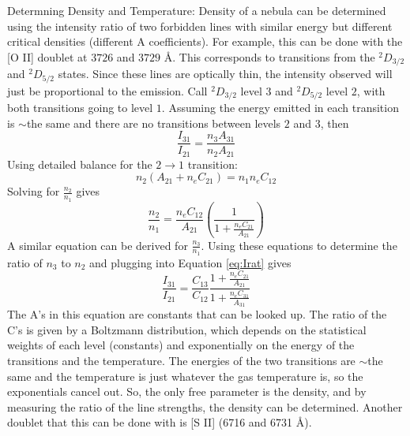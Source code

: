 Determning Density and Temperature:
Density of a nebula can be determined using the intensity ratio of two forbidden lines with 
similar energy but different critical densities (different A coefficients).  For example, 
this can be done with the [O II] doublet at $3726$ and $3729$ \AA.  This corresponds to transitions 
from the $^2D_{3/2}$ and $^2D_{5/2}$ states.  Since these lines are optically thin, the intensity 
observed will just be proportional to the emission.  Call $^2D_{3/2}$ level $3$ and $^2D_{5/2}$ 
level $2$, with both transitions going to level $1$.  Assuming the energy emitted in each 
transition is $\sim$the same and there are no transitions between levels $2$ and $3$, then
\begin{equation}\label{eq:Irat}
\frac{I_{31}}{I_{21}}=\frac{n_3A_{31}}{n_2A_{21}}
\end{equation}
Using detailed balance for the $2\rightarrow1$ transition:
\begin{equation}
n_2(A_{21}+n_eC_{21})=n_1n_eC_{12}
\end{equation}
Solving for $\frac{n_2}{n_1}$ gives
\begin{equation}
\frac{n_2}{n_1}=\frac{n_eC_{12}}{A_{21}}\left(\frac{1}{1+\frac{n_eC_{21}}{A_{21}}}\right)
\end{equation}
A similar equation can be derived for $\frac{n_3}{n_1}$.  Using these equations to determine 
the ratio of $n_3$ to $n_2$ and plugging into Equation \ref{eq:Irat} gives
\begin{equation}
\frac{I_{31}}{I_{21}}=\frac{C_{13}}{C_{12}}\frac{1+\frac{n_eC_{21}}{A_21}}{1+\frac{n_eC_{31}}{A_31}}
\end{equation}
The A's in this equation are constants that can be looked up.  The ratio of the C's is given by 
a Boltzmann distribution, which depends on the statistical weights of each level (constants) and 
exponentially on the energy of the transitions and the temperature.  The energies of the two 
transitions are $\sim$the same and the temperature is just whatever the gas temperature is, so 
the exponentials cancel out.  So, the only free parameter 
is the density, and by measuring the ratio of the line strengths, the density can be determined.  
Another doublet that this can be done with is [S II] (6716 and 6731 \AA).

